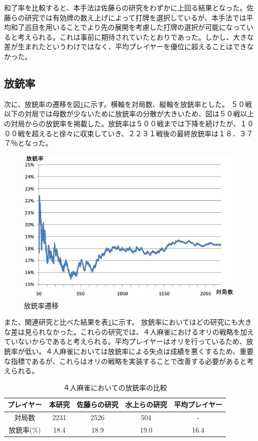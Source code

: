 和了率を比較すると、本手法は佐藤らの研究をわずかに上回る結果となった。佐藤らの研究では有効牌の数え上げによって打牌を選択しているが、本手法では平均和了巡目を用いることでより先の展開を考慮した打牌の選択が可能になっていると考えられる。これは事前に期待されていたとおりであった。しかし、大きな差が生まれたというわけではなく、平均プレイヤーを優位に超えることはできなかった。


\subsection{放銃率}
次に、放銃率の遷移を図\ref{houzyu2231}に示す。横軸を対局数、縦軸を放銃率とした。
５０戦以下の対局では母数が少ないために放銃率の分散が大きいため、図は５０戦以上の対局からの放銃率を掲載した。放銃率は５００戦までは下降を続けたが、１０００戦を超えると徐々に収束していき、２２３１戦後の最終放銃率は１８．３７７％となった。
\begin{figure}[h]
 \centering
 \includegraphics[keepaspectratio, scale=0.8,bb=0 0 544 370]
      {img/houzyu2231.jpg}
 \caption{放銃率遷移}
 \label{houzyu2231}
\end{figure}

また、関連研究と比べた結果を表\ref{tb:houzyu2231}に示す。
放銃率においてはどの研究にも大きな差は見られなかった。これらの研究では、４人麻雀におけるオリの戦略を加えていないからであると考えられる。平均プレイヤーはオリを行っているため、放銃率が低い。４人麻雀においては放銃率による失点は成績を悪くするため、重要な指標であるが、これらはオリの戦略を実装することで改善する必要があると考えられる。

\begin{table}[h]
  \caption{４人麻雀においての放銃率の比較}
  \label{tb:houzyu2231}
  \begin{center}
  \begin{tabular}{c||c|c|c|c}
    \hline
    プレイヤー   & 本研究 & 佐藤らの研究 & 水上らの研究 & 平均プレイヤー\\\hline\hline
    対局数   & 2231 & 2526 & 504 & - \\\hline
    放銃率(\%) & 18.4 & 18.9 & 19.0 & 16.4\\\hline
  \end{tabular}\end{center}
\end{table}

